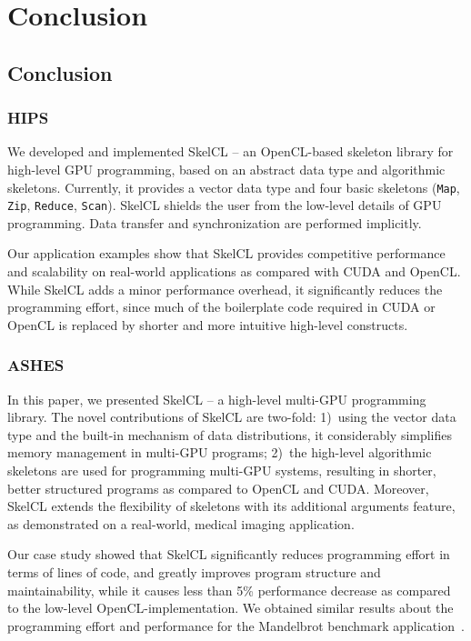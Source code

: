 
\chapter{Conclusion}

\label{ch:eighth} %

\section{Conclusion}

\subsection{HIPS}
We developed and implemented SkelCL -- an OpenCL-based skeleton library for high-level GPU programming, based on an abstract data type and algorithmic skeletons.
Currently, it provides a vector data type and four basic skeletons (\texttt{Map}, \texttt{Zip}, \texttt{Reduce}, \texttt{Scan}).
SkelCL shields the user from the low-level details of GPU programming.
Data transfer and synchronization are performed implicitly.

Our application examples show that SkelCL provides competitive performance and scalability on real-world applications as compared with CUDA and OpenCL.
While SkelCL adds a minor performance overhead, it significantly reduces the programming effort, since much of the boilerplate code required in CUDA or OpenCL is replaced by shorter and more intuitive high-level constructs.

\subsection{ASHES}
In this paper, we presented SkelCL -- a high-level multi-GPU programming library.
The novel contributions of SkelCL are two-fold:
1)~using the vector data type and the built-in mechanism of data distributions, it considerably simplifies memory management in multi-GPU programs;
2)~the high-level algorithmic skeletons are used for programming multi-GPU systems, resulting in shorter, better structured programs as compared to OpenCL and CUDA.
Moreover, SkelCL extends the flexibility of skeletons with its additional arguments feature, as demonstrated on a real-world, medical imaging application.

Our case study showed that SkelCL significantly reduces programming effort in terms of lines of code, and greatly improves program structure and maintainability, while it causes less than 5\% performance decrease as compared to the low-level OpenCL-implementation.
We obtained similar results about the programming effort and performance for the Mandelbrot benchmark application~\cite{StKG-11}.

